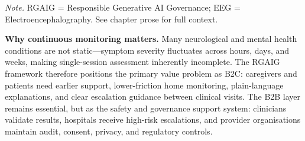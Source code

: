 \vspace{0.3em}\noindent\textit{Note.} RGAIG = Responsible Generative AI Governance; EEG = Electroencephalography. See chapter prose for full context.

\medskip
\noindent\textbf{Why continuous monitoring matters.}
Many neurological and mental health conditions are not static---symptom severity fluctuates across hours, days, and weeks, making single-session assessment inherently incomplete. The RGAIG framework therefore positions the primary value problem as B2C: caregivers and patients need earlier support, lower-friction home monitoring, plain-language explanations, and clear escalation guidance between clinical visits. The B2B layer remains essential, but as the safety and governance support system: clinicians validate results, hospitals receive high-risk escalations, and provider organisations maintain audit, consent, privacy, and regulatory controls.

